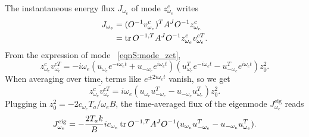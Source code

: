 \documentclass[
 amsmath,amssymb,
 aps,
 pre,
 longbibliography,
 10pt, onecolumn,
 notitlepage
]{revtex4-1}
\begin{document}
The instantaneous energy flux $J_{\omega_e}$ of mode $z^c_{\omega_e}$ writes
\begin{equation}
\begin{split}
J_{\omega_e} &= (O^{-1} v^{c}_{\omega_e})^T A^J O^{-1}z^c_{\omega_e} \\
&= \tr O^{-1,T} A^J O^{-1}z^c_{\omega_e} v^{cT}_{\omega_e} .
\end{split}
\end{equation}
From the expression of mode \eqnname~\eqref{eqnS:mode_zct},
\begin{equation}
z^c_{\omega_e} v^{cT}_{\omega_e} = -i\omega_e(u_{\omega_e} e^{-i\omega_e t} + u_{-\omega_e}e^{i\omega_e t})(u_{\omega_e}^T e^{-i\omega_e t} - u_{-\omega_e}^Te^{i\omega_e t})z_0^2 .
\end{equation}
When averaging over time, terms like $e^{\pm 2i\omega_e t}$ vanish, so we get
\begin{equation}
\overline{z^c_{\omega_e} v^{cT}_{\omega_e}} = i\omega_e(u_{\omega_e} u_{-\omega_e}^T - u_{-\omega_e} u_{\omega_e}^T)z_0^2 .
\end{equation}
Plugging in $z_0^2 = -2 c_{\omega_e} T_a / \omega_e B$, the time-averaged flux of the eigenmode $J_{\omega_e}^\text{eig}$ reads
\begin{equation} \label{eqnS:mode_J_isolated}
J_{\omega_e}^\text{eig} = -\frac{2T_ak}{B} ic_{\omega_e} \tr O^{-1,T}A^JO^{-1} (u_{\omega_e} u_{-\omega_e}^T - u_{-\omega_e} u_{\omega_e}^T) .
\end{equation}
\end{document}
